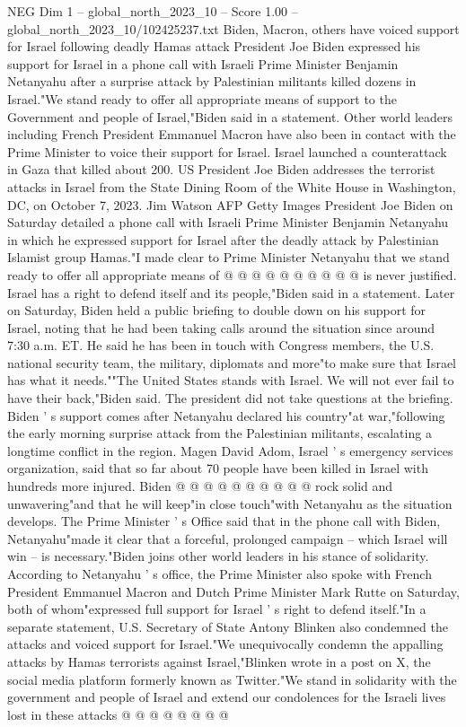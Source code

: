 \begin{textsample}{NEG Dim 1 – global\_north\_2023\_10 – Score 1.00 – global\_north\_2023\_10/102425237.txt}  \label{ex:f1_neg_132}
Biden, Macron, others have voiced support for Israel following deadly Hamas attack President Joe Biden expressed his support for Israel in a phone call with Israeli Prime Minister Benjamin Netanyahu after a surprise attack by Palestinian militants killed dozens in Israel."We stand ready to offer all appropriate means of support to the Government and people of Israel,"Biden said in a statement.
Other world leaders including French President Emmanuel Macron have also been in contact with the Prime Minister to voice their support for Israel.
Israel launched a counterattack in Gaza that killed about 200.
US President Joe Biden addresses the terrorist attacks in Israel from the State Dining Room of the White House in Washington, DC, on October 7, 2023.
Jim Watson AFP Getty Images President Joe Biden on Saturday detailed a phone call with Israeli Prime Minister Benjamin Netanyahu in which he expressed support for Israel after the deadly attack by Palestinian Islamist group Hamas."I made clear to Prime Minister Netanyahu that we stand ready to offer all appropriate means of @ @ @ @ @ @ @ @ @ @ is never justified.
Israel has a right to defend itself and its people,"Biden said in a statement.
Later on Saturday, Biden held a public briefing to double down on his support for Israel, noting that he had been taking calls around the situation since around 7:30 a.m.
ET.
He said he has been in touch with Congress members, the U.S. national security team, the military, diplomats and more"to make sure that Israel has what it needs.""The United States stands with Israel.
We will not ever fail to have their back,"Biden said.
The president did not take questions at the briefing.
Biden ' s support comes after Netanyahu declared his country"at war,"following the early morning surprise attack from the Palestinian militants, escalating a longtime conflict in the region.
Magen David Adom, Israel ' s emergency services organization, said that so far about 70 people have been killed in Israel with hundreds more injured.
Biden @ @ @ @ @ @ @ @ @ @ rock solid and unwavering"and that he will keep"in close touch"with Netanyahu as the situation develops.
The Prime Minister ' s Office said that in the phone call with Biden, Netanyahu"made it clear that a forceful, prolonged campaign -- which Israel will win -- is necessary."Biden joins other world leaders in his stance of solidarity.
According to Netanyahu ' s office, the Prime Minister also spoke with French President Emmanuel Macron and Dutch Prime Minister Mark Rutte on Saturday, both of whom"expressed full support for Israel ' s right to defend itself."In a separate statement, U.S.
Secretary of State Antony Blinken also condemned the attacks and voiced support for Israel."We unequivocally condemn the appalling attacks by Hamas terrorists against Israel,"Blinken wrote in a post on X, the social media platform formerly known as Twitter."We stand in solidarity with the government and people of Israel and extend our condolences for the Israeli lives lost in these attacks @ @ @ @ @ @ @ @

\end{textsample}
